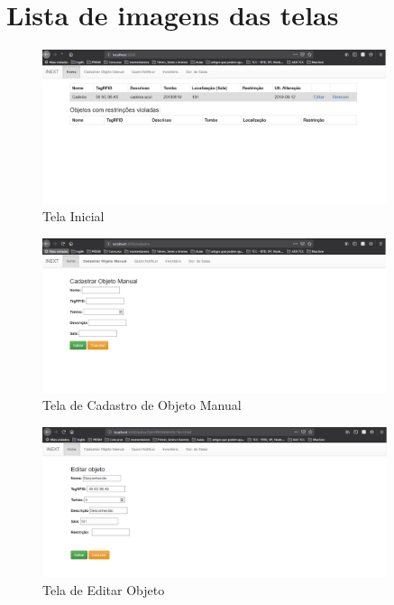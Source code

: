 \label{chapter:anexo}
\section{Lista de imagens das telas}
\begin{figure}[H]
              \caption{\label{fig:tela_inical2}Tela Inicial }
              \centering
              \includegraphics[width=0.9\textwidth]{Figuras/tela_inical2.PNG}
    \end{figure}
    
    \begin{figure}[H]
              \caption{\label{fig:tela_cadastro_manual}Tela de Cadastro de Objeto Manual}
              \centering
              \includegraphics[width=0.9\textwidth]{Figuras/tela_cadastro_manual.png}
    \end{figure}
    
    \begin{figure}[H]
              \caption{\label{fig:tela_cadastro_manual}Tela de Editar Objeto}
              \centering
              \includegraphics[width=0.9\textwidth]{Figuras/tela_editar.png}
    \end{figure}
    
